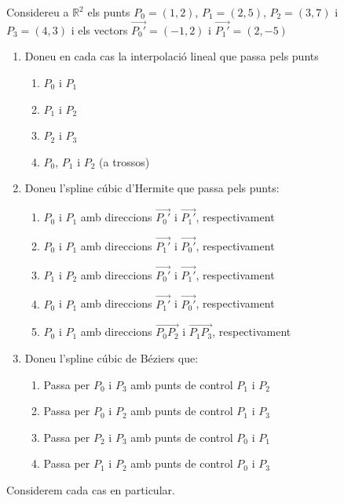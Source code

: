 \Exercise
\label{Ex:interpolacio}

Considereu a $\mathbb{R}^2$ els punts $P_0=(1,2)$, $P_1=(2,5)$, $P_2=(3,7)$ i $P_3=(4,3)$ i els vectors $\overrightarrow{P_0'}=(-1,2)$ i $\overrightarrow{P_1'}=(2,-5)$

\begin{enumerate}
  \item Doneu en cada cas la interpolació lineal que passa pels punts
  \begin{enumerate}
    \item $P_0$ i $P_1$
    \item $P_1$ i $P_2$
    \item $P_2$ i $P_3$
    \item $P_0$, $P_1$ i $P_2$ (a trossos)
  \end{enumerate}
  \item Doneu l'spline cúbic d'Hermite que passa pels punts:
  \begin{enumerate}
    \item $P_0$ i $P_1$ amb direccions $\overrightarrow{P_0'}$ i $\overrightarrow{P_1'}$, respectivament
    \item $P_0$ i $P_1$ amb direccions $\overrightarrow{P_1'}$ i $\overrightarrow{P_0'}$, respectivament
    \item $P_1$ i $P_2$ amb direccions $\overrightarrow{P_0'}$ i $\overrightarrow{P_1'}$, respectivament
    \item $P_0$ i $P_1$ amb direccions $\overrightarrow{P_1'}$ i $\overrightarrow{P_0'}$, respectivament
    \item $P_0$ i $P_1$ amb direccions $\overrightarrow{P_0P_2}$ i $\overrightarrow{P_1P_3}$, respectivament
  \end{enumerate}
  \item Doneu l'spline cúbic de Béziers que:
  \begin{enumerate}
    \item Passa per $P_0$ i $P_3$ amb punts de control $P_1$ i $P_2$
    \item Passa per $P_0$ i $P_2$ amb punts de control $P_1$ i $P_3$
    \item Passa per $P_2$ i $P_3$ amb punts de control $P_0$ i $P_1$
    \item Passa per $P_1$ i $P_2$ amb punts de control $P_0$ i $P_3$
  \end{enumerate}

\end{enumerate}

\Answer Considerem cada cas en particular.

